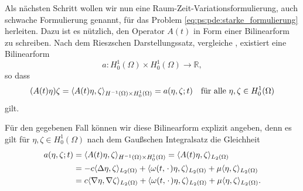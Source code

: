 
Als nächsten Schritt wollen wir nun eine Raum-Zeit-Variationsformulierung, auch schwache Formulierung genannt, für das Problem  \cref{eq:ps:pde:starke_formulierung} herleiten.
Dazu ist es nützlich, den Operator $A(t)$ in Form einer Bilinearform zu schreiben.
Nach dem Rieszschen Darstellungssatz, vergleiche \cite[Theorem \S{}22.1]{Halmos:1957vd}, existiert eine Bilinearform
\begin{equation}
    a \colon H^{1}_{0}(\Omega) \times H^{1}_{0}(\Omega) \to \mathbb{R},
\end{equation}
so dass
\begin{equation}
    (A(t)\eta)\zeta = \skp{A(t)\eta}{\zeta}{H^{-1}(\Omega) \times H^{1}_{0}(\Omega)} = a(\eta, \zeta; t) \quad \fa \eta, \zeta \in H^{1}_{0}(\Omega)
\end{equation}
gilt.


Für den gegebenen Fall können wir diese Bilinearform explizit angeben, denn es gilt für $\eta, \zeta \in H^{1}_{0}(\Omega)$ nach dem Gaußschen Integralsatz die Gleichheit
\begin{equation}
    \begin{aligned}
        a(\eta, \zeta; t)
        &=    \skp{A(t)\eta}{\zeta}{H^{-1}(\Omega) \times H^{1}_{0}(\Omega)}
        =  \skp{A(t)\eta}{\zeta}{L_{2}(\Omega)}
        \\&= - c \skp{\Delta \eta}{\zeta}{L_{2}(\Omega)}
                + \skp{\omega(t, \blank) \eta}{\zeta}{L_{2}(\Omega)}
                + \mu \skp{\eta}{\zeta}{L_{2}(\Omega)}
        \\&= c \skp{\grad \eta}{\grad \zeta}{L_{2}(\Omega)}
                + \skp{\omega(t, \blank) \eta}{\zeta}{L_{2}(\Omega)}
                + \mu \skp{\eta}{\zeta}{L_{2}(\Omega)}.
    \end{aligned}
\end{equation}

